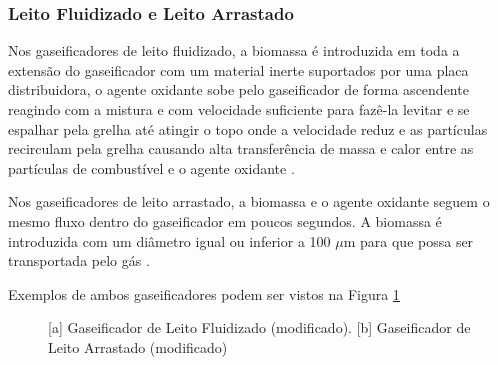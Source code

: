 \subsubsection{Leito Fluidizado e Leito Arrastado}

Nos gaseificadores de leito fluidizado, a biomassa é introduzida em toda a extensão do gaseificador com um material inerte suportados por uma placa distribuidora, o agente oxidante sobe pelo gaseificador de forma ascendente reagindo com a mistura \cite{sanchez2010} e com velocidade suficiente para fazê-la levitar e se espalhar pela grelha até atingir o topo onde a velocidade reduz e as partículas recirculam pela grelha causando alta transferência de massa e calor entre as partículas de combustível e o agente oxidante \cite{reed1988}. 

Nos gaseificadores de leito arrastado, a biomassa e o agente oxidante seguem o mesmo fluxo dentro do gaseificador em poucos segundos. A biomassa é introduzida com um diâmetro igual ou inferior a 100 $\mu$m para que possa ser transportada pelo gás \cite{higman2007}.

Exemplos de ambos gaseificadores podem ser vistos na Figura \ref{gaseificadores_outros}

\begin{figure}[!htb]
	\centering
	\quad %
	\caption{[a] Gaseificador de Leito Fluidizado \cite{khan2012}(modificado). [b] Gaseificador de Leito Arrastado \cite{wang2013}(modificado)}
	\label{gaseificadores_outros}
\end{figure}

